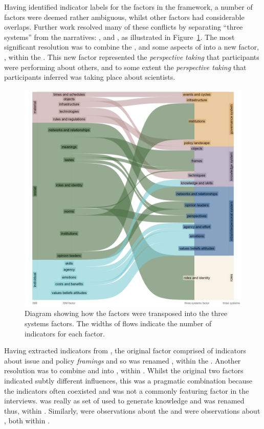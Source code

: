 Having identified indicator labels for the factors in the \ISM{} framework, a number of factors were deemed rather ambiguous, whilst other factors had considerable overlaps. Further work resolved many of these conflicts by separating ``three systems'' from the narratives: \skiinte, \skiknow{} and \skiscip, as illustrated in Figure~\ref{fig:resski}. The most significant resolution was to combine the \ISM{} \ismsn, \ismst{} and some aspects of \ismsm{} into a new factor, \skipers, within the \skiinte. This new factor represented the \emph{perspective taking} that participants were performing about others, and to some extent the \emph{perspective taking} that participants inferred was taking place about scientists. 

\begin{figure}[!ht]
    \centering
    \includegraphics[width=1\linewidth]{figures/ISM_to_threesystems.png}
    \caption{Diagram showing how the \ISM{} factors were transposed into the three systems factors. The widths of flows indicate the number of indicators for each factor.}
    \label{fig:resski}
\end{figure}

Having extracted \skipers{} indicators from \ismsm, the original \ISM{} factor comprised of indicators about issue and policy \emph{framings} and so was renamed \skifram, within the \skiknow. Another resolution was to combine \ISM{} \ismic{} and \ismia{} into \skiagen, within \skiinte. Whilst the original two factors indicated subtly different influences, this was a pragmatic combination because the indicators often coexisted and \ismic{} was not a commonly featuring factor in the interviews. \ISM{} \ismmt{} was really as set of \skitech{} used to generate knowledge and was renamed thus, within \skiknow. Similarly, \ISM{} \ismmr{} were observations about the \skipoli{} and \ismmts{} were observations about \skieven{}, both within \skiscip.

